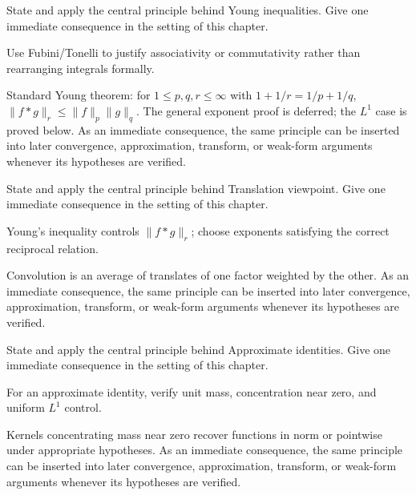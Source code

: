 \begin{exercise}\label{exr:iii10-03}
State and apply the central principle behind Young inequalities. Give one immediate consequence in the setting of this chapter.
\end{exercise}
\begin{hint}
Use Fubini/Tonelli to justify associativity or commutativity rather than rearranging integrals formally.
\end{hint}
\begin{solution}
Standard Young theorem: for $1\le p,q,r\le\infty$ with $1+1/r=1/p+1/q$, $\|f*g\|_r\le\|f\|_p\|g\|_q$. The general exponent proof is deferred; the $L^1$ case is proved below. As an immediate consequence, the same principle can be inserted into later convergence, approximation, transform, or weak-form arguments whenever its hypotheses are verified.
\end{solution}

\begin{exercise}\label{exr:iii10-04}
State and apply the central principle behind Translation viewpoint. Give one immediate consequence in the setting of this chapter.
\end{exercise}
\begin{hint}
Young's inequality controls \(\|f*g\|_r\); choose exponents satisfying the correct reciprocal relation.
\end{hint}
\begin{solution}
Convolution is an average of translates of one factor weighted by the other. As an immediate consequence, the same principle can be inserted into later convergence, approximation, transform, or weak-form arguments whenever its hypotheses are verified.
\end{solution}

\begin{exercise}\label{exr:iii10-05}
State and apply the central principle behind Approximate identities. Give one immediate consequence in the setting of this chapter.
\end{exercise}
\begin{hint}
For an approximate identity, verify unit mass, concentration near zero, and uniform \(L^1\) control.
\end{hint}
\begin{solution}
Kernels concentrating mass near zero recover functions in norm or pointwise under appropriate hypotheses. As an immediate consequence, the same principle can be inserted into later convergence, approximation, transform, or weak-form arguments whenever its hypotheses are verified.
\end{solution}

